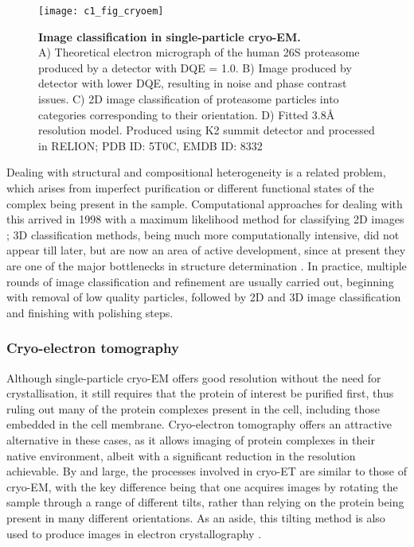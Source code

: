 \documentclass[a4paper,11pt,twoside,openright]{scrbook}
\begin{document}
\begin{figure}
    \texttt{[image: c1\_fig\_cryoem]}
    \caption[Image classification in single-particle cryo-EM]{\sffamily \textbf{Image classification in single-particle cryo-EM.} \\ \small A) Theoretical electron micrograph of the human 26S proteasome produced by a detector with DQE = 1.0. B) Image produced by detector with lower DQE, resulting in noise and phase contrast issues. C) 2D image classification of proteasome particles into categories corresponding to their orientation. D) Fitted 3.8Å resolution model. Produced using K2 summit detector and processed in RELION; PDB ID: 5T0C, EMDB ID: 8332 \cite{Chen2016}}
    \label{figure:cryoem}
\end{figure}

Dealing with structural and compositional heterogeneity is a related problem, which arises from imperfect purification or different functional states of the complex being present in the sample. Computational approaches for dealing with this arrived in 1998 with a maximum likelihood method for classifying 2D images \cite{Sigworth1998}; 3D classification methods, being much more computationally intensive, did not appear till later, but are now an area of active development, since at present they are one of the major bottlenecks in structure determination \cite{Scheres2007,Lyumkis2013,Punjani2017}. In practice, multiple rounds of image classification and refinement are usually carried out, beginning with removal of low quality particles, followed by 2D and 3D image classification and finishing with polishing steps.

\subsubsection{Cryo-electron tomography}
Although single-particle cryo-EM offers good resolution without the need for crystallisation, it still requires that the protein of interest be purified first, thus ruling out many of the protein complexes present in the cell, including those embedded in the cell membrane. Cryo-electron tomography offers an attractive alternative in these cases, as it allows imaging of protein complexes in their native environment, albeit with a significant reduction in the resolution achievable. By and large, the processes involved in cryo-ET are similar to those of cryo-EM, with the key difference being that one acquires images by rotating the sample through a range of different tilts, rather than relying on the protein being present in many different orientations. As an aside, this tilting method is also used to produce images in electron crystallography \cite{Wisedchaisri2011}.
\end{document}
